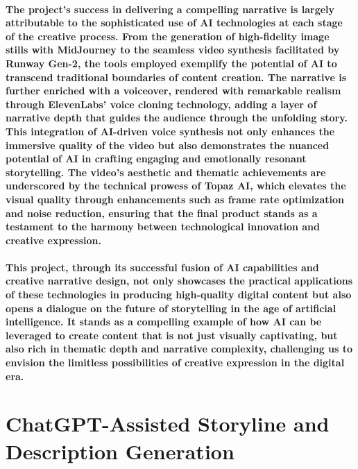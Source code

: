 \documentclass[11pt,a4paper,oneside]{report}
\begin{document}
\paragraph{The project's success in delivering a compelling narrative is largely attributable to the sophisticated use of AI technologies at each stage of the creative process. From the generation of high-fidelity image stills with MidJourney to the seamless video synthesis facilitated by Runway Gen-2, the tools employed exemplify the potential of AI to transcend traditional boundaries of content creation. The narrative is further enriched with a voiceover, rendered with remarkable realism through ElevenLabs' voice cloning technology, adding a layer of narrative depth that guides the audience through the unfolding story. This integration of AI-driven voice synthesis not only enhances the immersive quality of the video but also demonstrates the nuanced potential of AI in crafting engaging and emotionally resonant storytelling. The video's aesthetic and thematic achievements are underscored by the technical prowess of Topaz AI, which elevates the visual quality through enhancements such as frame rate optimization and noise reduction, ensuring that the final product stands as a testament to the harmony between technological innovation and creative expression.}

\paragraph{This project, through its successful fusion of AI capabilities and creative narrative design, not only showcases the practical applications of these technologies in producing high-quality digital content but also opens a dialogue on the future of storytelling in the age of artificial intelligence. It stands as a compelling example of how AI can be leveraged to create content that is not just visually captivating, but also rich in thematic depth and narrative complexity, challenging us to envision the limitless possibilities of creative expression in the digital era.}

\section{ChatGPT-Assisted Storyline and Description Generation}
\end{document}
